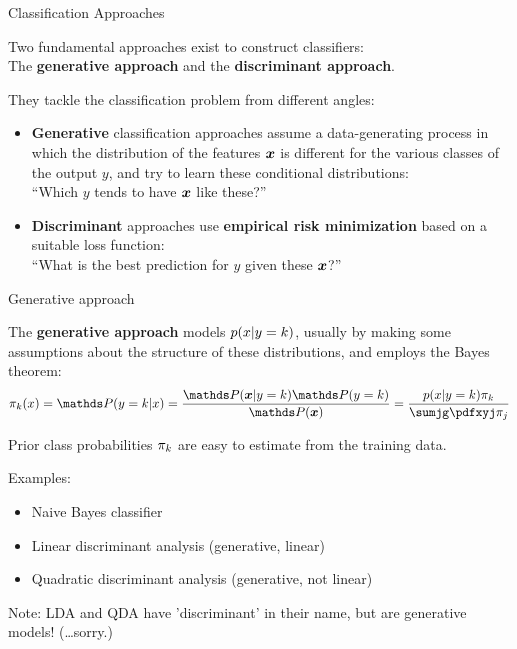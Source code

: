 \begin{vbframe}{Classification Approaches}

  Two fundamental approaches exist to construct classifiers:\\
  The \textbf{generative approach} and the \textbf{discriminant approach}.

\lz
They tackle the classification problem from different angles:

\begin{itemize}
\item \textbf{Generative} classification approaches assume a data-generating process in which the distribution of the features $\bm{x}$ is different for the various classes of the output $y$, and try to learn these conditional distributions:\\ \enquote{Which $y$ tends to have $\bm{x}$ like these?}
\lz
\item \textbf{Discriminant} approaches use \textbf{empirical risk minimization} based on a suitable loss function:\\ \enquote{What is the best prediction for $y$ given these $\bm{x}$?}
\end{itemize}
\end{vbframe}

\begin{vbframe}{Generative approach}

  The \textbf{generative approach}
  models $p(x | y=k)$, usually by making some assumptions about the structure of these distributions, and employs the Bayes theorem:
  $$\pikx = \postk = \frac{\P(\xv | y = k) \P(y = k)}{\P(\xv)} = \frac{\pdfxyk \pik}{\sumjg \pdfxyj \pi_j}$$


  Prior class probabilities $\pi_k$ are easy to estimate from the training data.

  \lz

  Examples:
  \begin{itemize}
  \item Naive Bayes classifier
  \item Linear discriminant analysis (generative, linear)
  \item Quadratic discriminant analysis (generative, not linear)
  \end{itemize}

{\small Note: LDA and QDA have 'discriminant' in their name, but are generative models! (\dots sorry.)}
\end{vbframe}

